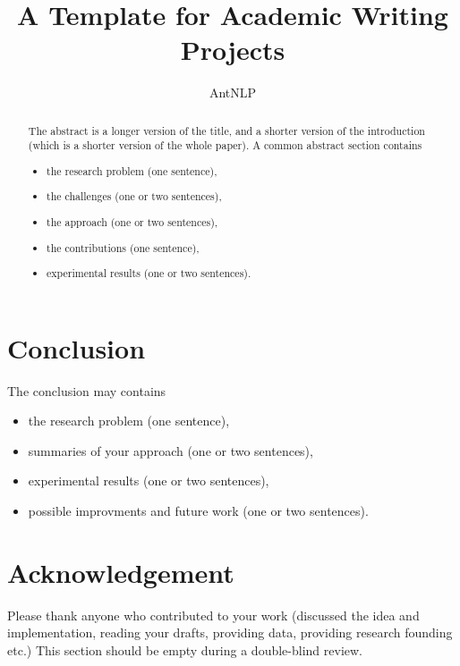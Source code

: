 \documentclass[11pt,a4paper]{article}
\title{A Template for Academic Writing Projects}
\author{AntNLP}
\date{}
\theoremstyle{definition}
\theoremstyle{remark}
\begin{document}
	\maketitle

\begin{abstract}
The abstract is a longer version of the title,
and a shorter version of the introduction
(which is a shorter version of the whole paper).
A common abstract section contains
\begin{itemize}
    \item the research problem (one sentence),
    \item the challenges (one or two sentences),
    \item the approach (one or two sentences),
    \item the contributions (one sentence),
    \item experimental results (one or two sentences).
\end{itemize}

\end{abstract}







\section{Conclusion}
The conclusion may contains
\begin{itemize}
    \item the research problem (one sentence),
    \item summaries of your approach (one or two sentences),
    \item experimental results (one or two sentences),
    \item possible improvments and future work (one or two sentences).
\end{itemize}



\section*{Acknowledgement}
Please thank anyone who contributed to your work
(discussed the idea and implementation, reading your drafts, providing data, 
providing research founding etc.)
This section should be empty during a double-blind review.



\end{document}
